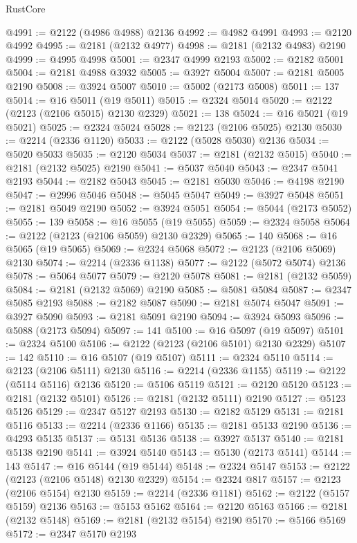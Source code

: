 \begin{lexlean}{RustCore}
\begin{coremodule}
@4991 := @2122 (@4986 @4988) @2136
@4992 := @4982 @4991
@4993 := @2120 @4992
@4995 := @2181 (@2132 @4977)
@4998 := @2181 (@2132 @4983) @2190
@4999 := @4995 @4998
@5001 := @2347 @4999 @2193
@5002 := @2182 @5001
@5004 := @2181 @4988 @3932
@5005 := @3927 @5004
@5007 := @2181 @5005 @2190
@5008 := @3924 @5007
@5010 := @5002 (@2173 @5008)
@5011 := 137
@5014 := @16 @5011 (@19 @5011)
@5015 := @2324 @5014
@5020 := @2122 (@2123 (@2106 @5015) @2130 @2329)
@5021 := 138
@5024 := @16 @5021 (@19 @5021)
@5025 := @2324 @5024
@5028 := @2123 (@2106 @5025) @2130
@5030 := @2214 (@2336 @1120)
@5033 := @2122 (@5028 @5030) @2136
@5034 := @5020 @5033
@5035 := @2120 @5034
@5037 := @2181 (@2132 @5015)
@5040 := @2181 (@2132 @5025) @2190
@5041 := @5037 @5040
@5043 := @2347 @5041 @2193
@5044 := @2182 @5043
@5045 := @2181 @5030
@5046 := @4198 @2190
@5047 := @2996 @5046
@5048 := @5045 @5047
@5049 := @3927 @5048
@5051 := @2181 @5049 @2190
@5052 := @3924 @5051
@5054 := @5044 (@2173 @5052)
@5055 := 139
@5058 := @16 @5055 (@19 @5055)
@5059 := @2324 @5058
@5064 := @2122 (@2123 (@2106 @5059) @2130 @2329)
@5065 := 140
@5068 := @16 @5065 (@19 @5065)
@5069 := @2324 @5068
@5072 := @2123 (@2106 @5069) @2130
@5074 := @2214 (@2336 @1138)
@5077 := @2122 (@5072 @5074) @2136
@5078 := @5064 @5077
@5079 := @2120 @5078
@5081 := @2181 (@2132 @5059)
@5084 := @2181 (@2132 @5069) @2190
@5085 := @5081 @5084
@5087 := @2347 @5085 @2193
@5088 := @2182 @5087
@5090 := @2181 @5074 @5047
@5091 := @3927 @5090
@5093 := @2181 @5091 @2190
@5094 := @3924 @5093
@5096 := @5088 (@2173 @5094)
@5097 := 141
@5100 := @16 @5097 (@19 @5097)
@5101 := @2324 @5100
@5106 := @2122 (@2123 (@2106 @5101) @2130 @2329)
@5107 := 142
@5110 := @16 @5107 (@19 @5107)
@5111 := @2324 @5110
@5114 := @2123 (@2106 @5111) @2130
@5116 := @2214 (@2336 @1155)
@5119 := @2122 (@5114 @5116) @2136
@5120 := @5106 @5119
@5121 := @2120 @5120
@5123 := @2181 (@2132 @5101)
@5126 := @2181 (@2132 @5111) @2190
@5127 := @5123 @5126
@5129 := @2347 @5127 @2193
@5130 := @2182 @5129
@5131 := @2181 @5116
@5133 := @2214 (@2336 @1166)
@5135 := @2181 @5133 @2190
@5136 := @4293 @5135
@5137 := @5131 @5136
@5138 := @3927 @5137
@5140 := @2181 @5138 @2190
@5141 := @3924 @5140
@5143 := @5130 (@2173 @5141)
@5144 := 143
@5147 := @16 @5144 (@19 @5144)
@5148 := @2324 @5147
@5153 := @2122 (@2123 (@2106 @5148) @2130 @2329)
@5154 := @2324 @817
@5157 := @2123 (@2106 @5154) @2130
@5159 := @2214 (@2336 @1181)
@5162 := @2122 (@5157 @5159) @2136
@5163 := @5153 @5162
@5164 := @2120 @5163
@5166 := @2181 (@2132 @5148)
@5169 := @2181 (@2132 @5154) @2190
@5170 := @5166 @5169
@5172 := @2347 @5170 @2193

\end{coremodule}
\end{lexlean}
